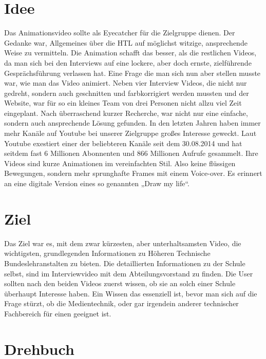 \section{Idee}
\renewcommand{\kapitelautor}{Autor: Niklas Kienreich}
Das Animationsvideo sollte als Eyecatcher für die Zielgruppe dienen. Der Gedanke war, Allgemeines über die HTL auf möglichst witzige, ansprechende Weise zu vermitteln. Die Animation schafft das besser, als die restlichen Videos, da man sich bei den Interviews auf eine lockere, aber doch ernste, zielführende Gesprächsführung verlassen hat. Eine Frage die man sich nun aber stellen musste war, wie man das Video animiert. Neben vier Interview Videos, die nicht nur gedreht, sondern auch geschnitten und farbkorrigiert werden mussten und der Website, war für so ein kleines Team von drei Personen nicht allzu viel Zeit eingeplant. Nach überraschend kurzer Recherche, war nicht nur eine einfache, sondern auch ansprechende Lösung gefunden. In den letzten Jahren haben immer mehr Kanäle auf Youtube bei unserer Zielgruppe großes Interesse geweckt. Laut Youtube exestiert einer der beliebteren Kanäle seit dem 30.08.2014 und hat seitdem fast 6 Millionen Abonnenten und 866 Millionen Aufrufe gesammelt. 
Ihre Videos sind kurze Animationen im vereinfachten Stil. Also keine flüssigen Bewegungen, sondern mehr sprunghafte Frames mit einem Voice-over. Es erinnert an eine digitale Version eines so genannten „Draw my life“.
\section{Ziel}
\renewcommand{\kapitelautor}{Autor: Niklas Kienreich}
Das Ziel war es, mit dem zwar kürzesten, aber unterhaltsamsten Video, die wichtigsten, grundlegenden Informationen zu Höheren Technische Bundeslehranstalten zu bieten. Die detaillierten Informationen zu der Schule selbst, sind im Interviewvideo mit dem Abteilungsvorstand zu finden. Die User sollten nach den beiden Videos zuerst wissen, ob sie an solch einer Schule überhaupt Interesse haben. Ein Wissen das essenziell ist, bevor man sich auf die Frage stürzt, ob die Medientechnik, oder gar irgendein anderer technischer Fachbereich für einen geeignet ist.

\section{Drehbuch}
\renewcommand{\kapitelautor}{Autor: Niklas Kienreich}

